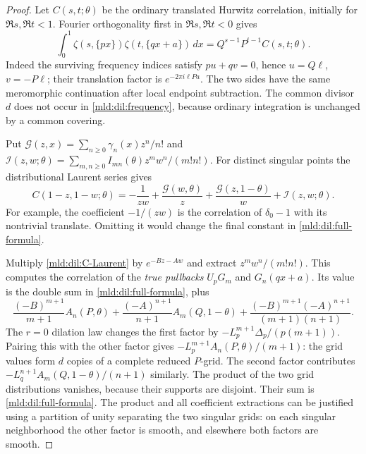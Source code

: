 \begin{proof}
Let $C(s,t;\theta)$ be the ordinary translated Hurwitz correlation,
initially for $\Re s,\Re t<1$.  Fourier orthogonality first in
$\Re s,\Re t<0$ gives
\begin{equation}
 \int_0^1\zeta(s,\{px\})\zeta(t,\{qx+a\})\,dx
                   =Q^{s-1}P^{t-1}C(s,t;\theta).
 \label{mld:dil:frequency}
\end{equation}
Indeed the surviving frequency indices satisfy $pu+qv=0$, hence
$u=Q\ell$, $v=-P\ell$; their translation factor is
$e^{-2\pi i\ell Pa}$.  The two sides have the same meromorphic
continuation after local endpoint subtraction.  The common divisor $d$
does not occur in \eqref{mld:dil:frequency}, because ordinary integration is
unchanged by a common covering.

Put $\mathcal G(z,x)=\sum_{n\ge0}\gamma_n(x)z^n/n!$ and
$\mathcal I(z,w;\theta)=\sum_{m,n\ge0}I_{mn}(\theta)z^mw^n/(m!n!)$.
For distinct singular points the distributional Laurent series gives
\begin{equation}
 C(1-z,1-w;\theta)
 =-\frac1{zw}+\frac{\mathcal G(w,\theta)}z
                +\frac{\mathcal G(z,1-\theta)}w
                +\mathcal I(z,w;\theta).
 \label{mld:dil:C-Laurent}
\end{equation}
For example, the coefficient $-1/(zw)$ is the correlation of
$\delta_0-1$ with its nontrivial translate.  Omitting it would change
the final constant in \eqref{mld:dil:full-formula}.

Multiply \eqref{mld:dil:C-Laurent} by $e^{-Bz-Aw}$ and extract
$z^mw^n/(m!n!)$.  This computes the correlation of the \emph{true
pullbacks} $U_pG_m$ and $G_n(qx+a)$.  Its value is the double sum in
\eqref{mld:dil:full-formula}, plus
\[
 \frac{(-B)^{m+1}}{m+1}A_n(P,\theta)
 +\frac{(-A)^{n+1}}{n+1}A_m(Q,1-\theta)
 +\frac{(-B)^{m+1}(-A)^{n+1}}{(m+1)(n+1)}.
\]
The $r=0$ dilation law changes the first factor by
$-L_p^{m+1}\Delta_p/(p(m+1))$.  Pairing this with the other factor
gives $-L_p^{m+1}A_n(P,\theta)/(m+1)$: the grid values form $d$
copies of a complete reduced $P$-grid.  The second factor contributes
$-L_q^{n+1}A_m(Q,1-\theta)/(n+1)$ similarly.  The product of the two
grid distributions vanishes, because their supports are disjoint.
Their sum is \eqref{mld:dil:full-formula}.  The product and all coefficient
extractions can be justified using a partition of unity separating the
two singular grids: on each singular neighborhood the other factor is
smooth, and elsewhere both factors are smooth.
\end{proof}

